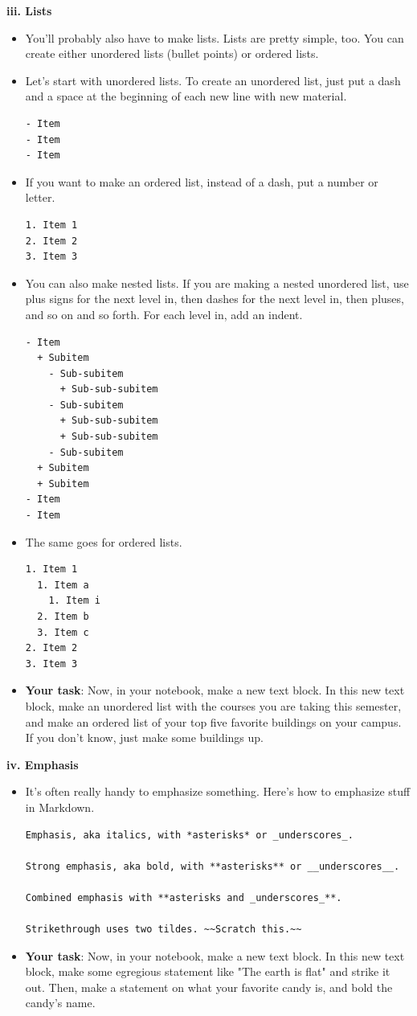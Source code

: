 \textbf{iii. Lists}
\begin{itemize}
	\item You'll probably also have to make lists. Lists are pretty simple, too. You can create either unordered lists (bullet points) or ordered lists.
	\item Let's start with unordered lists. To create an unordered list, just put a dash and a space at the beginning of each new line with new material.
	\begin{lstlisting}[style=none]
- Item
- Item 
- Item
	\end{lstlisting}
	\item If you want to make an ordered list, instead of a dash, put a number or letter.
	\begin{lstlisting}[style=none]
1. Item 1
2. Item 2
3. Item 3
	\end{lstlisting}
	\item You can also make nested lists. If you are making a nested unordered list, use plus signs for the next level in, then dashes for the next level in, then pluses, and so on and so forth. For each level in, add an indent.
	\begin{lstlisting}[style=none]
- Item
  + Subitem
    - Sub-subitem
      + Sub-sub-subitem
    - Sub-subitem
      + Sub-sub-subitem
      + Sub-sub-subitem
    - Sub-subitem
  + Subitem
  + Subitem
- Item
- Item
	\end{lstlisting}
	\item The same goes for ordered lists.
	\begin{lstlisting}[style=none]
1. Item 1
  1. Item a
    1. Item i
  2. Item b
  3. Item c
2. Item 2
3. Item 3
	\end{lstlisting}
	\item \textbf{Your task}: Now, in your notebook, make a new text block. In this new text block, make an unordered list with the courses you are taking this semester, and make an ordered list of your top five favorite buildings on your campus. If you don't know, just make some buildings up.
\end{itemize}
\textbf{iv. Emphasis}
\begin{itemize}
	\item It's often really handy to emphasize something. Here's how to emphasize stuff in Markdown.
	\begin{lstlisting}[style=none]
Emphasis, aka italics, with *asterisks* or _underscores_.

Strong emphasis, aka bold, with **asterisks** or __underscores__.

Combined emphasis with **asterisks and _underscores_**.

Strikethrough uses two tildes. ~~Scratch this.~~
	\end{lstlisting}
	\item \textbf{Your task}: Now, in your notebook, make a new text block. In this new text block, make some egregious statement like "The earth is flat" and strike it out. Then, make a statement on what your favorite candy is, and bold the candy's name.
\end{itemize}
